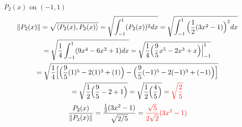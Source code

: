 \item [2.] $P_2(x)$ on $(-1,1)$\vspace{-5mm}
\begin{gather*}
    \left \lVert P_2(x) \right \rVert 
    = \sqrt{\langle P_2(x), P_2(x) \rangle}
    = \sqrt{\int_{-1}^1 (P_2(x))^2dx}
    = \sqrt{\int_{-1}^{1} \Big(\frac{1}{2}(3x^2-1)\Big)^2dx}\\
    = \sqrt{\frac{1}{4}\int_{-1}^{1} (9x^4-6x^2+1)dx}
    = \sqrt{\frac{1}{4} \Big(\frac{9}{5}x^5-2x^3+x\Big)\Big|_{-1}^{1}}\\
    = \sqrt{\frac{1}{4} 
    \Big[
    \Big(\frac{9}{5}(1)^5-2(1)^3+(1)\Big)
    -
    \Big(\frac{9}{5}(-1)^5-2(-1)^3+(-1)\Big)
    \Big]
    }\\
    = \sqrt{\frac{1}{2} 
    \Big(\frac{9}{5}-2+1\Big)
    }
    = \sqrt{\frac{1}{2} 
    \Big(\frac{4}{5}\Big)
    }
    = \textcolor{red}{\sqrt{\frac{2}{5}}}
\end{gather*}
\begin{gather*}
    \frac{P_2(x)}{\left \lVert P_2(x) \right \rVert} 
    = \frac{\frac{1}{2}(3x^2-1)}{\sqrt{2/5}}
    = \textcolor{red}{\frac{\sqrt{5}}{2\sqrt{2}}(3x^2-1)}
\end{gather*}
